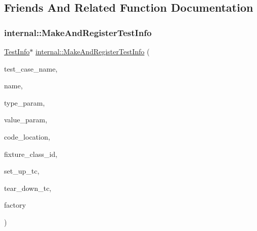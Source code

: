 \subsection{Friends And Related Function Documentation}
\mbox{\label{classtesting_1_1_test_info_a70ddf8a12d8c05f17429f6381abc8ace}} 
\subsubsection{\texorpdfstring{internal\+::\+Make\+And\+Register\+Test\+Info}{internal::MakeAndRegisterTestInfo}}
{\footnotesize\ttfamily \hyperlink{classtesting_1_1_test_info}{Test\+Info}$\ast$ \hyperlink{namespacetesting_1_1internal_a7f2e4e46c969fcae9d801d93a3e932fd}{internal\+::\+Make\+And\+Register\+Test\+Info} (\begin{DoxyParamCaption}\item[{const char $\ast$}]{test\+\_\+case\+\_\+name,  }\item[{const char $\ast$}]{name,  }\item[{const char $\ast$}]{type\+\_\+param,  }\item[{const char $\ast$}]{value\+\_\+param,  }\item[{\hyperlink{structtesting_1_1internal_1_1_code_location}{internal\+::\+Code\+Location}}]{code\+\_\+location,  }\item[{\hyperlink{namespacetesting_1_1internal_ab1114197d3c657d8b7f8e0c5caa12d00}{internal\+::\+Type\+Id}}]{fixture\+\_\+class\+\_\+id,  }\item[{\hyperlink{classtesting_1_1_test_a5f2a051d1d99c9b784c666c586186cf9}{Test\+::\+Set\+Up\+Test\+Case\+Func}}]{set\+\_\+up\+\_\+tc,  }\item[{\hyperlink{classtesting_1_1_test_aa0f532e93b9f3500144c53f31466976c}{Test\+::\+Tear\+Down\+Test\+Case\+Func}}]{tear\+\_\+down\+\_\+tc,  }\item[{\hyperlink{classtesting_1_1internal_1_1_test_factory_base}{internal\+::\+Test\+Factory\+Base} $\ast$}]{factory }\end{DoxyParamCaption})\hspace{0.3cm}{\ttfamily [friend]}}

\mbox{\label{classtesting_1_1_test_info_adc037d188dab349a94868991955c9cd4}} 
